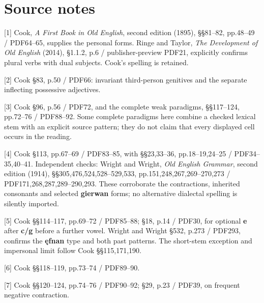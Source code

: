 \clearpage
\section*{Source notes}

\begingroup\fontsize{10}{12.8}\selectfont
[1] Cook, \emph{A First Book in Old English}, second edition (1895), §§81–82, pp.48–49 /\allowbreak{} PDF64–65, supplies the personal forms. Ringe and Taylor, \emph{The Development of Old English} (2014), §1.1.2, p.6 /\allowbreak{} publisher-preview PDF21, explicitly confirms plural verbs with dual subjects. Cook’s spelling is retained.

[2] Cook §83, p.50 /\allowbreak{} PDF66: invariant third-person genitives and the separate inflecting possessive adjectives.

[3] Cook §96, p.56 /\allowbreak{} PDF72, and the complete weak paradigms, §§117–124, pp.72–76 /\allowbreak{} PDF88–92. Some complete paradigms here combine a checked lexical stem with an explicit source pattern; they do not claim that every displayed cell occurs in the reading.

[4] Cook §113, pp.67–69 /\allowbreak{} PDF83–85, with §§23,33–36, pp.18–19,24–25 /\allowbreak{} PDF34–35,40–41. Independent checks: Wright and Wright, \emph{Old English Grammar}, second edition (1914), §§305,476,524,528–529,533, pp.151,248,267,269–270,273 /\allowbreak{} PDF171,268,287,289–290,293. These corroborate the contractions, inherited consonants and selected \textbf{gierwan} forms; no alternative dialectal spelling is silently imported.

[5] Cook §§114–117, pp.69–72 /\allowbreak{} PDF85–88; §18, p.14 /\allowbreak{} PDF30, for optional \textbf{e} after \textbf{c/\allowbreak{}g} before a further vowel. Wright and Wright §532, p.273 /\allowbreak{} PDF293, confirms the \textbf{ęfnan} type and both past patterns. The short-stem exception and impersonal limit follow Cook §§115,171,190.

[6] Cook §§118–119, pp.73–74 /\allowbreak{} PDF89–90.

[7] Cook §§120–124, pp.74–76 /\allowbreak{} PDF90–92; §29, p.23 /\allowbreak{} PDF39, on frequent negative contraction.

